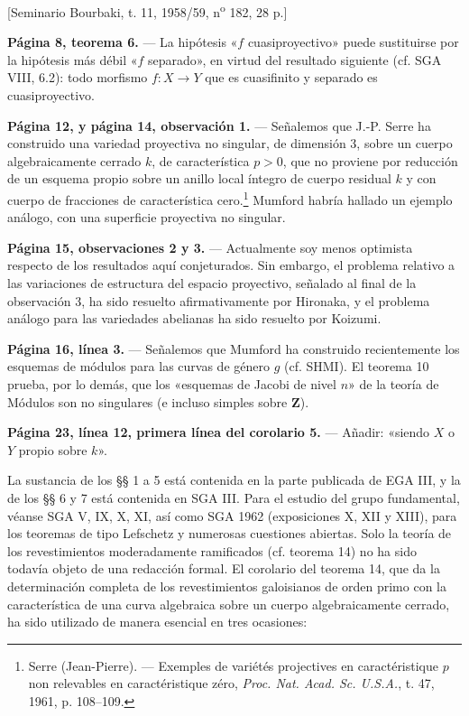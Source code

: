 \documentclass[11pt,twoside,openany]{book}
\numberwithin{equation}{section}
\newcommand{\src}[1]{%
  \phantomsection\hypertarget{src:#1}{}%
  \marginpar{\raggedleft\footnotesize\sffamily #1}%
}
\theoremstyle{plain}
\theoremstyle{definition}
\theoremstyle{remark}
\newcommand{\FgaUnitKey}{frontmatter}
\renewcommand{\src}[1]{%
  \phantomsection\hypertarget{src:\FgaUnitKey:#1}{}%
  \marginpar{\raggedleft\footnotesize\sffamily #1}%
}
\theoremstyle{plain}
\theoremstyle{definition}
\theoremstyle{remark}
\begin{document}
\begin{center}
[Seminario Bourbaki, t. 11, 1958/59, n\textsuperscript{o} 182, 28 p.]
\end{center}

\noindent\textbf{Página 8, teorema 6.} --- La hipótesis «$f$
cuasiproyectivo» puede sustituirse por la hipótesis más débil «$f$
separado», en virtud del resultado siguiente (cf. SGA VIII, 6.2): todo morfismo
$f:X\longrightarrow Y$ que es cuasifinito y separado es cuasiproyectivo.

\src{299}
\noindent\textbf{Página 12, y página 14, observación 1.} --- Señalemos que J.-P.
Serre ha construido una variedad proyectiva no singular, de dimensión 3, sobre
un cuerpo algebraicamente cerrado $k$, de característica $p>0$, que no proviene
por reducción de un esquema propio sobre un anillo local íntegro de cuerpo
residual $k$ y con cuerpo de fracciones de característica
cero.\footnote{Serre (Jean-Pierre). --- Exemples de variétés projectives en
caractéristique $p$ non relevables en caractéristique zéro, \emph{Proc. Nat.
Acad. Sc. U.S.A.}, t. 47, 1961, p. 108--109.} Mumford habría hallado un ejemplo
análogo, con una superficie proyectiva no singular.

\noindent\textbf{Página 15, observaciones 2 y 3.} --- Actualmente soy menos
optimista respecto de los resultados aquí conjeturados. Sin embargo, el
problema relativo a las variaciones de estructura del espacio proyectivo,
señalado al final de la observación 3, ha sido resuelto afirmativamente por
Hironaka, y el problema análogo para las variedades abelianas ha sido resuelto
por Koizumi.

\noindent\textbf{Página 16, línea 3.} --- Señalemos que Mumford ha construido
recientemente los esquemas de módulos para las curvas de género $g$ (cf. SHMI).
El teorema 10 prueba, por lo demás, que los «esquemas de Jacobi de nivel $n$»
de la teoría de Módulos son no singulares (e incluso simples sobre $\mathbf Z$).

\noindent\textbf{Página 23, línea 12, primera línea del corolario
5.} --- Añadir: «siendo $X$ o $Y$ propio sobre $k$».

La sustancia de los §§ 1 a 5 está contenida en la parte publicada de EGA III, y
la de los §§ 6 y 7 está contenida en SGA III. Para el estudio del grupo
fundamental, véanse SGA V, IX, X, XI, así como SGA 1962 (exposiciones X, XII y
XIII), para los teoremas de tipo Lefschetz y numerosas cuestiones abiertas.
Solo la teoría de los revestimientos moderadamente ramificados (cf. teorema 14)
no ha sido todavía objeto de una redacción formal. El corolario del teorema 14,
que da la determinación completa de los revestimientos galoisianos de orden
primo con la característica de una curva algebraica sobre un cuerpo
algebraicamente cerrado, ha sido utilizado de manera esencial en tres ocasiones:
\end{document}
